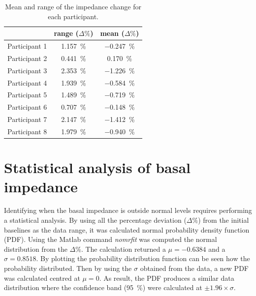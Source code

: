 \begin{table}[!htbp]
	\caption[Range and mean change of impedance of each participant]{Mean and range of the impedance change for each participant.}
	\label{tbl:change imepdance}
	\centering \small
	\begin{tabular}{lcc}
		\toprule
		&\textbf{range ($\Delta \%$)}
		&\textbf{mean ($\Delta \%$)} \\ \midrule
		Participant 1    &     \SI{1.157}{\percent}    &     \SI{-0.247}{\percent}    \\  
		Participant 2    &     \SI{0.441}{\percent}    &     \SI{0.170}{\percent}    \\  
		Participant 3    &     \SI{2.353}{\percent}    &     \SI{-1.226}{\percent}    \\  
		Participant 4    &     \SI{1.939}{\percent}    &     \SI{-0.584}{\percent}    \\  
		Participant 5    &     \SI{1.489}{\percent}    &     \SI{-0.719}{\percent}    \\  
		Participant 6    &     \SI{0.707}{\percent}    &     \SI{-0.148}{\percent}    \\  
		Participant 7    &     \SI{2.147}{\percent}    &     \SI{-1.412}{\percent}    \\  
		Participant 8    &     \SI{1.979}{\percent}    &     \SI{-0.940}{\percent}    \\ 
		\bottomrule 
	\end{tabular}
\end{table}

\section{Statistical analysis of basal impedance}
\label{senction basal 4} 
Identifying when the basal impedance is outside normal levels requires performing a statistical analysis. By using all the percentage deviation ($\Delta \%$) from the initial baselines as the data range, it was calculated normal probability density function (PDF). Using the Matlab command \textit{nomrfit} was computed the normal distribution from the $\Delta \%$. The calculation returned a $\mu = -0.6384$ and a $\sigma = 0.8518$. By plotting the probability distribution function can be seen how the probability distributed. Then by using the $\sigma$ obtained from the data, a new PDF was calculated centred at $\mu = 0$. As result, the PDF produces a similar data distribution where the confidence band (\SI{95}{\percent}) were calculated at $\pm 1.96 \times\sigma$.


